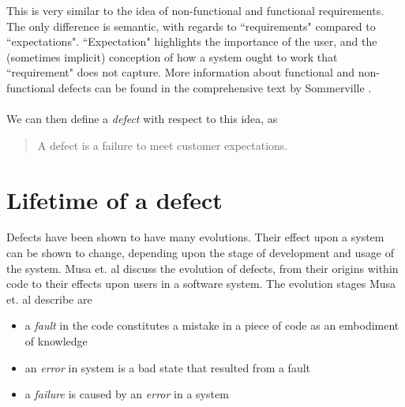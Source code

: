 This is very similar to the idea of non-functional and functional requirements.
The only difference is semantic, with regards to ``requirements" compared to ``expectations".
``Expectation" highlights the importance of the user, and the (sometimes implicit) conception of
how a system ought to work that ``requirement" does not capture.
More information about functional and non-functional defects can be found in the comprehensive
text by Sommerville \cite{sommerville1989software}.\\
\\
We can then define a {\em defect} with respect to this idea, as
\begin{quote}
	A defect is a failure to meet customer expectations.
\end{quote}

\section{Lifetime of a defect} \label{sec:defect:lifetime}

Defects have been shown to have many evolutions.
Their effect upon a system can be shown to change, depending upon the stage of development and
usage of the system.
Musa et. al \cite{musa1987software} discuss the evolution of defects, from their origins within
code to their effects upon users in a software system.
The evolution stages Musa et. al describe are
\begin{itemize}
	\item a {\em fault} in the code constitutes a mistake in a piece of code as an embodiment of
		knowledge
	\item an {\em error} in system is a bad state that resulted from a fault
	\item a {\em failure} is caused by an {\em error} in a system
\end{itemize}

